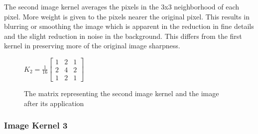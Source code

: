 \documentclass[12pt,letterpaper]{article}
\begin{document}
The second image kernel averages the pixels in the 3x3 neighborhood of each pixel. More weight is given to the pixels nearer the original pixel. This results in blurring or smoothing the image which is apparent in the reduction in fine details and the slight reduction in noise in the background. This differs from the first kernel in preserving more of the original image sharpness.
\begin{figure}[ht]
\centering
$K_2 = \frac{1}{16} \begin{bmatrix}
1 & 2 & 1\\
2 & 4 & 2\\
1 & 2 & 1
\end{bmatrix}$
\hspace{2cm} 
\caption{\small{The matrix representing the second image kernel and the image after its application}
\label{fig:ker2} }
\end{figure}

\subsubsection{Image Kernel 3}
\end{document}
